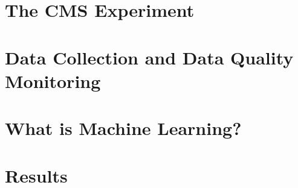 \documentclass[12pt,twoside,openany]{book}
\begin{document}
\chapter{The CMS Experiment\label{LHCCMS}}


\chapter{Data Collection and Data Quality Monitoring \label{DQMchapter} }


\chapter{What is Machine Learning?\label{ML}}


\chapter{Results \label{ch:results}}


%


\nocite{*}
%
%
\printbibliography[title={References}]
\end{document}
